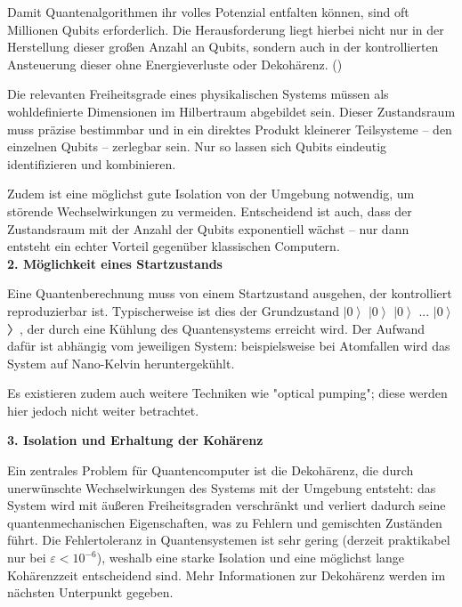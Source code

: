 Damit Quantenalgorithmen ihr volles Potenzial entfalten können, sind oft Millionen Qubits erforderlich. Die Herausforderung liegt hierbei nicht nur in der Herstellung dieser großen Anzahl an Qubits, sondern auch in der kontrollierten Ansteuerung dieser ohne Energieverluste oder Dekohärenz. 
(\cite{lapierre_introduction_2021})

Die relevanten Freiheitsgrade eines physikalischen Systems müssen als wohldefinierte Dimensionen im Hilbertraum abgebildet sein. Dieser Zustandsraum muss präzise bestimmbar und in ein direktes Produkt kleinerer Teilsysteme – den einzelnen Qubits – zerlegbar sein. Nur so lassen sich Qubits eindeutig identifizieren und kombinieren.

Zudem ist eine möglichst gute Isolation von der Umgebung notwendig, um störende Wechselwirkungen zu vermeiden. Entscheidend ist auch, dass der Zustandsraum mit der Anzahl der Qubits exponentiell wächst – nur dann entsteht ein echter Vorteil gegenüber klassischen Computern.
 \\

\textbf{{2. Möglichkeit eines Startzustands} }

Eine Quantenberechnung muss von einem Startzustand ausgehen, der kontrolliert reproduzierbar ist. Typischerweise ist dies der Grundzustand \(\left| 0\right\rangle\) \(\left| 0\right\rangle\) \(\left| 0\right\rangle\) ... \(\left| 0\right\rangle\)〉, der durch eine Kühlung des Quantensystems erreicht wird.  Der Aufwand dafür ist abhängig vom jeweiligen System: beispielsweise bei Atomfallen wird das System auf Nano-Kelvin heruntergekühlt. 

Es existieren zudem auch weitere Techniken wie "optical pumping"; diese werden hier jedoch nicht weiter betrachtet. 

\cite{lapierre_introduction_2021} 


\textbf{3. Isolation und Erhaltung der Kohärenz} 

Ein zentrales Problem für Quantencomputer ist die Dekohärenz, die durch unerwünschte Wechselwirkungen des Systems mit der Umgebung entsteht: das System wird mit äußeren Freiheitsgraden verschränkt und verliert dadurch seine quantenmechanischen Eigenschaften, was zu Fehlern und gemischten Zuständen führt. Die Fehlertoleranz in Quantensystemen ist sehr gering (derzeit praktikabel nur bei $\varepsilon < 10^{-6}$), weshalb eine starke Isolation und eine möglichst lange Kohärenzzeit entscheidend sind. Mehr Informationen zur Dekohärenz werden im nächsten Unterpunkt gegeben. \\
 
